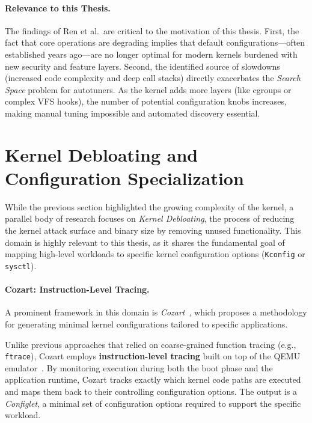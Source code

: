\paragraph{Relevance to this Thesis.}
The findings of Ren et al.\ are critical to the motivation of this thesis. 
First, the fact that core operations are degrading implies that default configurations—often established years ago—are no longer optimal for modern kernels burdened with new security and feature layers. 
Second, the identified source of slowdowns (increased code complexity and deep call stacks) directly exacerbates the \textit{Search Space} problem for autotuners. 
As the kernel adds more layers (like cgroups or complex VFS hooks), the number of potential configuration knobs increases, making manual tuning impossible and automated discovery essential.

\section{Kernel Debloating and Configuration Specialization}\label{sec:bg-debloating}

While the previous section highlighted the growing complexity of the kernel, a parallel body of research focuses on \textit{Kernel Debloating}, the process of reducing the kernel attack surface and binary size by removing unused functionality. This domain is highly relevant to this thesis, as it shares the fundamental goal of mapping high-level workloads to specific kernel configuration options (\texttt{Kconfig} or \texttt{sysctl}).

\paragraph{Cozart: Instruction-Level Tracing.}
A prominent framework in this domain is \textit{Cozart}~\cite{cozart_cacm}, which proposes a methodology for generating minimal kernel configurations tailored to specific applications. 

Unlike previous approaches that relied on coarse-grained function tracing (e.g., \texttt{ftrace}), Cozart employs \textbf{instruction-level tracing} built on top of the QEMU emulator~\cite{qemu}. 
By monitoring execution during both the boot phase and the application runtime, Cozart tracks exactly which kernel code paths are executed and maps them back to their controlling configuration options.
The output is a \textit{Configlet}, a minimal set of configuration options required to support the specific workload.


